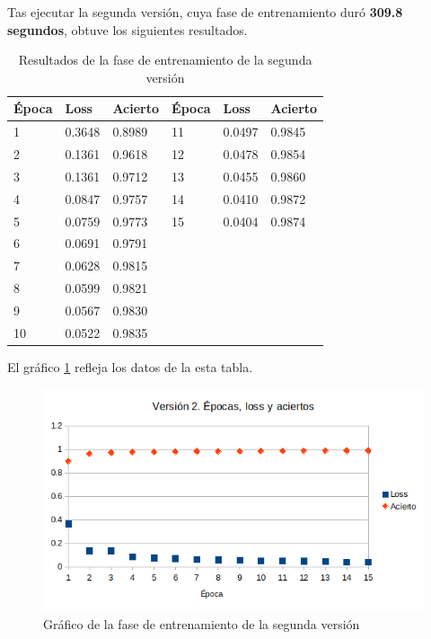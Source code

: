 Tas ejecutar la segunda versión, cuya fase de entrenamiento duró \textbf{309.8 segundos}, obtuve los siguientes resultados.

\bigskip

\begin{table}[H]
  \centering
  \begin{tabular}{|l|l|l||l|l|l|}
    \hline
    \textbf{Época} & \textbf{Loss} & \textbf{Acierto} & \textbf{Época} & \textbf{Loss} & \textbf{Acierto} \\
    \hline
    1                       & 0.3648 & 0.8989 & 11 & 0.0497 & 0.9845 \\
    2                       & 0.1361 & 0.9618 & 12 & 0.0478 & 0.9854 \\
    3                       & 0.1361 & 0.9712 & 13 & 0.0455 & 0.9860 \\
    4                       & 0.0847 & 0.9757 & 14 & 0.0410 & 0.9872 \\
    5                       & 0.0759 & 0.9773 & 15 & 0.0404 & 0.9874 \\
    6                       & 0.0691 & 0.9791 &    &        &        \\
    7                       & 0.0628 & 0.9815 &    &        &        \\
    8                       & 0.0599 & 0.9821 &    &        &        \\
    9                       & 0.0567 & 0.9830 &    &        &        \\
    10                      & 0.0522 & 0.9835 &    &        &        \\
    \hline
  \end{tabular}
  \label{tab:v2}
  \caption{Resultados de la fase de entrenamiento de la segunda versión}
\end{table}

\bigskip

El gráfico \ref{fig:res-v2} refleja los datos de la esta tabla.

\bigskip

\begin{figure}[H]
  \centering
  \includegraphics[width=1\textwidth]{../images/results-v2}
  \caption{Gráfico de la fase de entrenamiento de la segunda versión}
  \label{fig:res-v2}
\end{figure}

